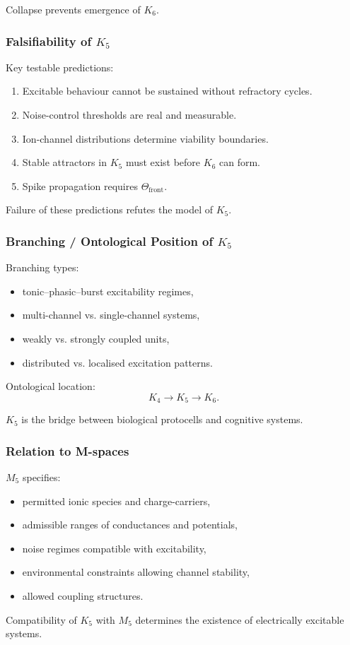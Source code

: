 Collapse prevents emergence of $K_6$.

\subsubsection{Falsifiability of \texorpdfstring{$K_5$}{K_5}}

Key testable predictions:
\begin{enumerate}
    \item Excitable behaviour cannot be sustained without refractory
          cycles.
    \item Noise-control thresholds are real and measurable.
    \item Ion-channel distributions determine viability boundaries.
    \item Stable attractors in $K_5$ must exist before $K_6$ can form.
    \item Spike propagation requires $\Theta_{\mathrm{front}}$.
\end{enumerate}

Failure of these predictions refutes the model of $K_5$.

\subsubsection{Branching / Ontological Position of \texorpdfstring{$K_5$}{K_5}}

Branching types:
\begin{itemize}
    \item tonic–phasic–burst excitability regimes,
    \item multi-channel vs. single-channel systems,
    \item weakly vs. strongly coupled units,
    \item distributed vs. localised excitation patterns.
\end{itemize}

Ontological location:
\[
K_4 \to K_5 \to K_6.
\]

$K_5$ is the bridge between biological protocells and cognitive systems.

\subsubsection{Relation to M-spaces}

$M_5$ specifies:
\begin{itemize}
    \item permitted ionic species and charge-carriers,
    \item admissible ranges of conductances and potentials,
    \item noise regimes compatible with excitability,
    \item environmental constraints allowing channel stability,
    \item allowed coupling structures.
\end{itemize}

Compatibility of $K_5$ with $M_5$ determines the existence of
electrically excitable systems.

